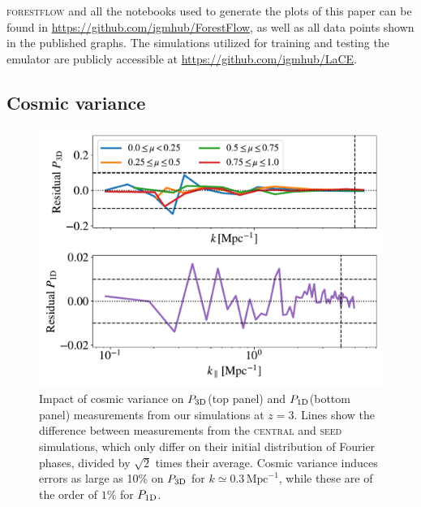 \documentclass[longauth]{aa}
\newcommand{\poned}{\ensuremath{P_{\rm 1D}}\xspace}
\newcommand{\pthreed}{\ensuremath{P_{\rm 3D}}\xspace}
\newcommand{\forestflow}{\textsc{forestflow}\xspace}
\newcommand{\simseed}{\textsc{seed}\xspace}
\newcommand{\simcentral}{\textsc{central}\xspace}
\newcommand{\iMpc}{\ensuremath{\,\mathrm{Mpc}^{-1}}}
\begin{document}
\forestflow and all the notebooks used to generate the plots of this paper can be found in \url{https://github.com/igmhub/ForestFlow}, as well as all data points shown in the published graphs. The simulations utilized for training and testing the emulator are publicly accessible at \url{https://github.com/igmhub/LaCE}.






\begin{appendix}


\section{Cosmic variance}
\label{sec:cosmic_variance}

\begin{figure}
    \centering\includegraphics[width=\columnwidth]{figures/cvariance_z_3.0.pdf}
    \caption{Impact of cosmic variance on \pthreed (top panel) and \poned (bottom panel) measurements from our simulations at $z=3$. Lines show the difference between measurements from the \simcentral and \simseed simulations, which only differ on their initial distribution of Fourier phases, divided by $\sqrt{2}$ times their average. Cosmic variance induces errors as large as 10\% on \pthreed for $k\simeq0.3\iMpc$, while these are of the order of $1\%$ for \poned.}
    \label{fig:cvar}
\end{figure}



\end{appendix}
\end{document}
